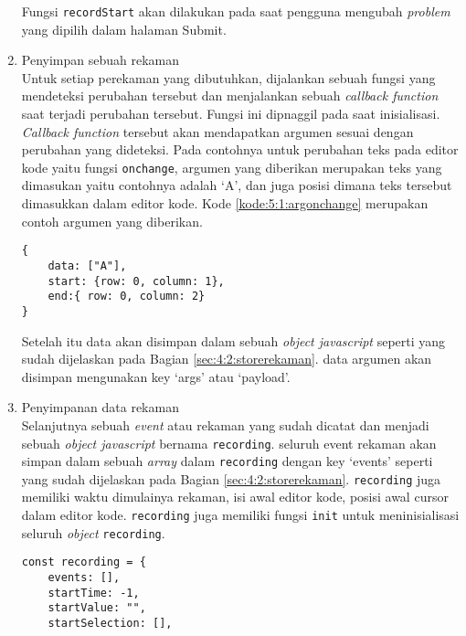 \begin{enumerate}
    Fungsi \verb|recordStart| akan dilakukan pada saat pengguna mengubah \textit{problem} yang dipilih dalam halaman Submit.


    \item Penyimpan sebuah rekaman \\
    Untuk setiap perekaman yang dibutuhkan, dijalankan sebuah fungsi yang mendeteksi perubahan tersebut dan menjalankan sebuah \textit{callback function} saat terjadi perubahan tersebut. Fungsi ini dipnaggil pada saat inisialisasi. \textit{Callback function} tersebut akan mendapatkan argumen sesuai dengan perubahan yang dideteksi. Pada contohnya untuk perubahan teks pada editor kode yaitu fungsi \verb|onchange|, argumen yang diberikan merupakan teks yang dimasukan yaitu contohnya adalah `A', dan juga posisi dimana teks tersebut dimasukkan dalam editor kode. Kode \ref{kode:5:1:argonchange} merupakan contoh argumen yang diberikan.
    \begin{lstlisting}[caption={Contoh argumen yang diberikan oleh fungsi onchange}, label={kode:5:1:argonchange}]
{
    data: ["A"], 
    start: {row: 0, column: 1}, 
    end:{ row: 0, column: 2}
}
    \end{lstlisting}
    Setelah itu data akan disimpan dalam sebuah \textit{object javascript}
    seperti yang sudah dijelaskan pada Bagian \ref{sec:4:2:storerekaman}. data argumen akan disimpan mengunakan key `args' atau `payload'.
    
    \item Penyimpanan data rekaman \\
    Selanjutnya sebuah \textit{event} atau rekaman yang sudah dicatat dan menjadi sebuah \textit{object javascript} bernama \verb|recording|. seluruh event rekaman akan simpan dalam sebuah \textit{array} dalam \verb|recording| dengan key `events' seperti yang sudah dijelaskan pada Bagian \ref{sec:4:2:storerekaman}. \verb|recording| juga memiliki waktu dimulainya rekaman, isi awal editor kode, posisi awal cursor dalam editor kode. \verb|recording| juga memiliki fungsi \verb|init| untuk meninisialisasi seluruh \textit{object} \verb|recording|.

    \begin{lstlisting}[caption={Contoh argumen yang diberikan oleh fungsi onchange}, label={kode:5:1:recordingobj}]
const recording = {
    events: [],
    startTime: -1,
    startValue: "",
    startSelection: [],


\end{lstlisting}
\end{enumerate}
